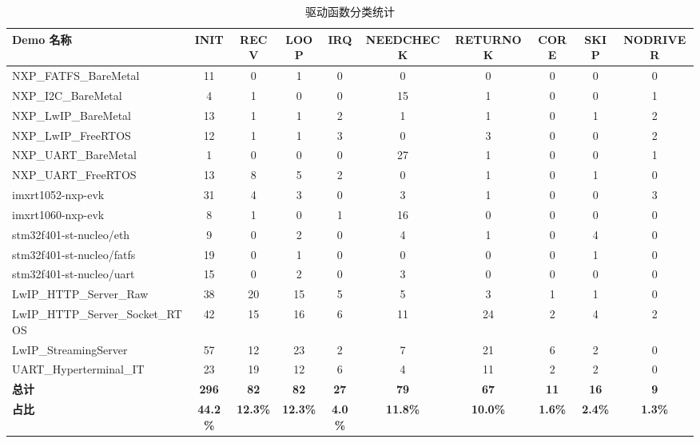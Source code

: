 \begin{table}[htbp]
\centering
\caption{驱动函数分类统计}
\label{tab:function_categories_stats}
\scriptsize
\begin{adjustbox}{max width=\textwidth}
\begin{tabular}{lccccccccc}
\toprule
\textbf{Demo 名称} & \textbf{INIT} & \textbf{RECV} & \textbf{LOOP} & \textbf{IRQ} & \textbf{NEEDCHECK} & \textbf{RETURNOK} & \textbf{CORE} & \textbf{SKIP} & \textbf{NODRIVER} \\
\midrule
NXP\_FATFS\_BareMetal & 11 & 0 & 1 & 0 & 0 & 0 & 0 & 0 & 0 \\
NXP\_I2C\_BareMetal & 4 & 1 & 0 & 0 & 15 & 1 & 0 & 0 & 1 \\
NXP\_LwIP\_BareMetal & 13 & 1 & 1 & 2 & 1 & 1 & 0 & 1 & 2 \\
NXP\_LwIP\_FreeRTOS & 12 & 1 & 1 & 3 & 0 & 3 & 0 & 0 & 2 \\
NXP\_UART\_BareMetal & 1 & 0 & 0 & 0 & 27 & 1 & 0 & 0 & 1 \\
NXP\_UART\_FreeRTOS & 13 & 8 & 5 & 2 & 0 & 1 & 0 & 1 & 0 \\
imxrt1052-nxp-evk & 31 & 4 & 3 & 0 & 3 & 1 & 0 & 0 & 3 \\
imxrt1060-nxp-evk & 8 & 1 & 0 & 1 & 16 & 0 & 0 & 0 & 0 \\
stm32f401-st-nucleo/eth & 9 & 0 & 2 & 0 & 4 & 1 & 0 & 4 & 0 \\
stm32f401-st-nucleo/fatfs & 19 & 0 & 1 & 0 & 0 & 0 & 0 & 1 & 0 \\
stm32f401-st-nucleo/uart & 15 & 0 & 2 & 0 & 3 & 0 & 0 & 0 & 0 \\
LwIP\_HTTP\_Server\_Raw & 38 & 20 & 15 & 5 & 5 & 3 & 1 & 1 & 0 \\
LwIP\_HTTP\_Server\_Socket\_RTOS & 42 & 15 & 16 & 6 & 11 & 24 & 2 & 4 & 2 \\
LwIP\_StreamingServer & 57 & 12 & 23 & 2 & 7 & 21 & 6 & 2 & 0 \\
UART\_Hyperterminal\_IT & 23 & 19 & 12 & 6 & 4 & 11 & 2 & 2 & 0 \\
\midrule
\textbf{总计} & \textbf{296} & \textbf{82} & \textbf{82} & \textbf{27} & \textbf{79} & \textbf{67} & \textbf{11} & \textbf{16} & \textbf{9} \\
\midrule
\textbf{占比} & \textbf{44.2\%} & \textbf{12.3\%} & \textbf{12.3\%} & \textbf{4.0\%} & \textbf{11.8\%} & \textbf{10.0\%} & \textbf{1.6\%} & \textbf{2.4\%} & \textbf{1.3\%} \\
\bottomrule
\end{tabular}
\end{adjustbox}
\end{table}

